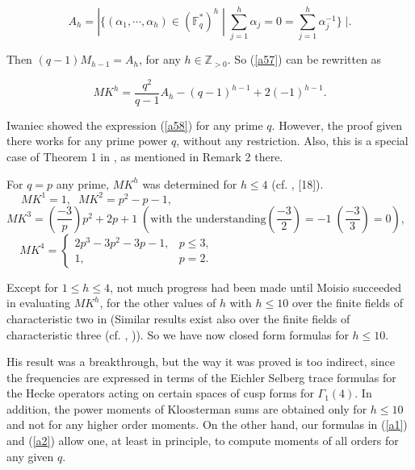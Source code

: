 \documentclass[a4,12pt]{elsart}
\begin{document}
\begin{equation*}
A_{h}=|\{(\alpha_1,\cdots,\alpha_h)\in({\mathbb{F}}_{q}^{*})^h \; | \;
\sum_{j=1}^{h}\alpha_j = 0 =\sum_{j=1}^{h} \alpha_{j}^{-1}\}\;|.
\end{equation*}

Then $(q-1)M_{h-1}=A_h$, for any $h \in {\mathbb{Z}}_{>0}$. So (\ref{a57}) can
be rewritten as

\begin{equation}\label{a58}
MK^h=\frac{q^2}{q-1}A_h-(q-1)^{h-1}+2(-1)^{h-1}.
\end{equation}

Iwaniec \cite{H1} showed the expression (\ref{a58}) for any prime
$q$. However, the proof given there works for any prime power $q$,
without any restriction. Also, this is a special case of Theorem 1
in \cite{HD}, as mentioned in Remark 2 there.

For $q=p$ any prime, $MK^{h}$ was determined for $h \leq 4$ (cf.
\cite{H1}, [18]).
\begin{equation*}
 MK^1=1, \;\;MK^2=p^2-p-1, \qquad \qquad \qquad\qquad\qquad\qquad\qquad\qquad\qquad\qquad
\end{equation*}
\begin{equation*}
MK^3=(\frac{-3}{p})p^2+2p+1 \; (\textrm{with the understanding}
(\frac{-3}{2})=-1 \; (\frac{-3}{3})=0), \qquad
\end{equation*}
\begin{equation*}
MK^4=
\begin{cases}
 2p^3-3p^2-3p-1,     & p \leq 3,\\
 1, & p=2.  \qquad \qquad \qquad\qquad\qquad\qquad\qquad\qquad \;\;
\end{cases}
\end{equation*}

Except \cite{L1} for $1 \leq h \leq 4$,  not much progress had been
made until Moisio succeeded in evaluating $MK^h$, for the other
values of $h$ with $h \leq 10$ over the finite fields of
characteristic two in \cite{M1}(Similar results exist also over the
finite fields of characteristic three (cf. \cite{GM}, \cite{M2})).
So we have now closed form formulas for $h \leq 10$.

His result was a breakthrough, but the way it was proved is too
indirect, since the frequencies are expressed in terms of the
Eichler Selberg trace formulas for the Hecke operators acting on
certain spaces of cusp forms for $\Gamma_{1}(4)$. In addition, the
power moments of Kloosterman sums are obtained only for $h \leq 10$
and not for any higher order moments. On the other hand, our
formulas in (\ref{a1}) and (\ref{a2}) allow one, at least in
principle, to compute moments of all orders for any given $q$.
\end{document}
